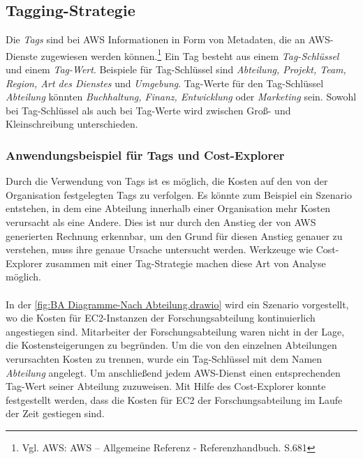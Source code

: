 \subsection*{Tagging-Strategie}
%
Die \textit{Tags} sind bei AWS Informationen in Form von Metadaten, die an AWS-Dienste zugewiesen werden können.\footnote{Vgl. AWS: AWS – Allgemeine Referenz - Referenzhandbuch. S.681\cite{AMZ29}} Ein Tag besteht aus einem \textit{Tag-Schlüssel} und einem \textit{Tag-Wert}. Beispiele für Tag-Schlüssel sind \textit{Abteilung, Projekt, Team, Region, Art des Dienstes} und \textit{Umgebung}. Tag-Werte für den Tag-Schlüssel \textit{Abteilung} könnten \textit{Buchhaltung, Finanz, Entwicklung} oder \textit{Marketing} sein. Sowohl bei Tag-Schlüssel als auch bei Tag-Werte wird zwischen Groß- und Kleinschreibung unterschieden. 

\subsubsection*{Anwendungsbeispiel für Tags und Cost-Explorer}
Durch die Verwendung von Tags ist es möglich, die Kosten auf den von der Organisation festgelegten Tags zu verfolgen. Es könnte zum Beispiel ein Szenario entstehen, in dem eine Abteilung innerhalb einer Organisation mehr Kosten verursacht als eine Andere. Dies ist nur durch den Anstieg der von AWS generierten Rechnung erkennbar, um den Grund für diesen Anstieg genauer zu verstehen, muss ihre genaue Ursache untersucht werden. Werkzeuge wie Cost-Explorer zusammen mit einer Tag-Strategie machen diese Art von Analyse möglich.
\\\\
In der \autoref{fig:BA Diagramme-Nach Abteilung.drawio} wird ein Szenario vorgestellt, wo die Kosten für EC2-Instanzen der Forschungsabteilung kontinuierlich angestiegen sind. Mitarbeiter der Forschungsabteilung waren nicht in der Lage, die Kostensteigerungen zu begründen. 
Um die von den einzelnen Abteilungen verursachten Kosten zu trennen, wurde ein Tag-Schlüssel mit dem Namen \textit{Abteilung} angelegt. Um anschließend jedem AWS-Dienst einen entsprechenden Tag-Wert seiner Abteilung zuzuweisen. Mit Hilfe des Cost-Explorer konnte festgestellt werden, dass die Kosten für EC2 der Forschungsabteilung im Laufe der Zeit gestiegen sind. 
\newpage
